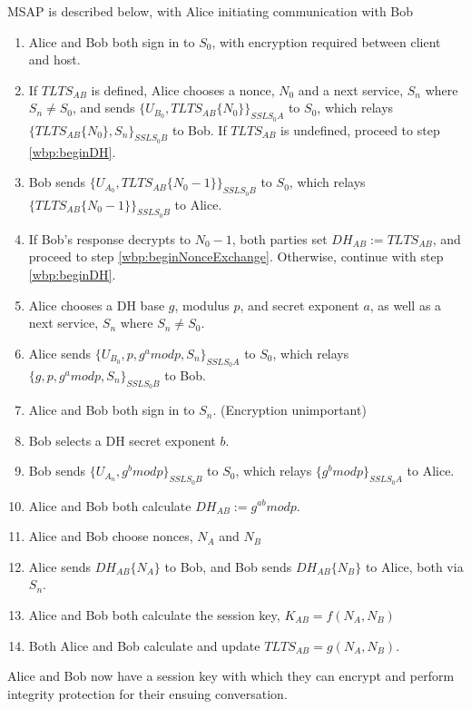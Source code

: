 \documentclass[twoside,10pt]{article}
\begin{document}
\begin{multicols}{2}
MSAP is described below, with Alice initiating communication with Bob
\begin{enumerate}
\item Alice and Bob both sign in to $S_0$, with encryption required between client and host.
\item If $TLTS_{AB}$ is defined, Alice chooses a nonce, $N_0$ and a next service, $S_n$ where $S_n \neq S_0$, and sends $\{U_{B_0}, TLTS_{AB}\{N_0\}\}_{SSL S_0 A}$ to $S_0$, which relays $\{TLTS_{AB}\{N_0\}, S_n\}_{SSL S_0 B}$ to Bob.  If $TLTS_{AB}$ is undefined, proceed to step \ref{wbp:beginDH}.
\item Bob sends $\{U_{A_0}, TLTS_{AB}\{N_0-1\}\}_{SSL S_0 B}$ to $S_0$, which relays $\{TLTS_{AB}\{N_0-1\}\}_{SSL S_0 B}$ to Alice.
\item If Bob's response decrypts to $N_0-1$, both parties set $DH_{AB}:=TLTS_{AB}$, and proceed to step \ref{wbp:beginNonceExchange}.  Otherwise, continue with step \ref{wbp:beginDH}.
\item \label{wbp:beginDH} Alice chooses a DH base $g$, modulus $p$, and secret exponent $a$, as well as a next service, $S_n$ where $S_n \neq S_0$.
\item Alice sends $\{U_{B_0}, p, g^a mod p, S_n\}_{SSL S_0 A}$ to $S_0$, which relays $\{g, p, g^a mod p, S_n\}_{SSL S_0 B}$ to Bob.
\item Alice and Bob both sign in to $S_n$.  (Encryption unimportant)
\item Bob selects a DH secret exponent $b$.
\item Bob sends $\{U_{A_n}, g^b mod p\}_{SSL S_0 B}$ to $S_0$, which relays $\{g^b mod p\}_{SSL S_0 A}$ to Alice.
\item Alice and Bob both calculate $DH_{AB}:=g^{ab} mod p$.
\item \label{wbp:beginNonceExchange} Alice and Bob choose nonces, $N_A$ and $N_B$
\item Alice sends $DH_{AB}\{N_A\}$ to Bob, and Bob sends $DH_{AB}\{N_B\}$ to Alice, both via $S_n$.
\item Alice and Bob both calculate the session key, $K_{AB}=f(N_A, N_B)$
\item Both Alice and Bob calculate and update $TLTS_{AB}=g(N_A, N_B)$.
\end{enumerate}

Alice and Bob now have a session key with which they can encrypt and perform integrity protection for their ensuing conversation.


\end{multicols}
\end{document}
